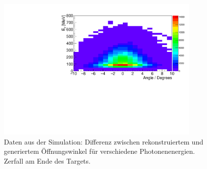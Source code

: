 \documentclass[a4paper,11pt,oneside,final,german,openbib,pdftex]{scrbook}
\begin{document}
{\begin{appendix}
\begin{figure}[h!]
	\begin{center}
		\includegraphics[width=100mm]{OeffZVertex/20170205DiffOeffZVertex+4}
		\caption[Simulation: Differenz zwischen rek. und gen. \"Offnungswinkel: Zerfall am Ende des Targets]{Daten aus der Simulation: Differenz zwischen rekonstruiertem und generiertem \"Offnungswinkel f\"ur verschiedene Photonenenergien. Zerfall am Ende des Targets.}
		\label{fig:OeffZVertex4}
		
	\end{center}
\end{figure}

\listoffigures



\listoftables




\end{appendix}}
\end{document}
